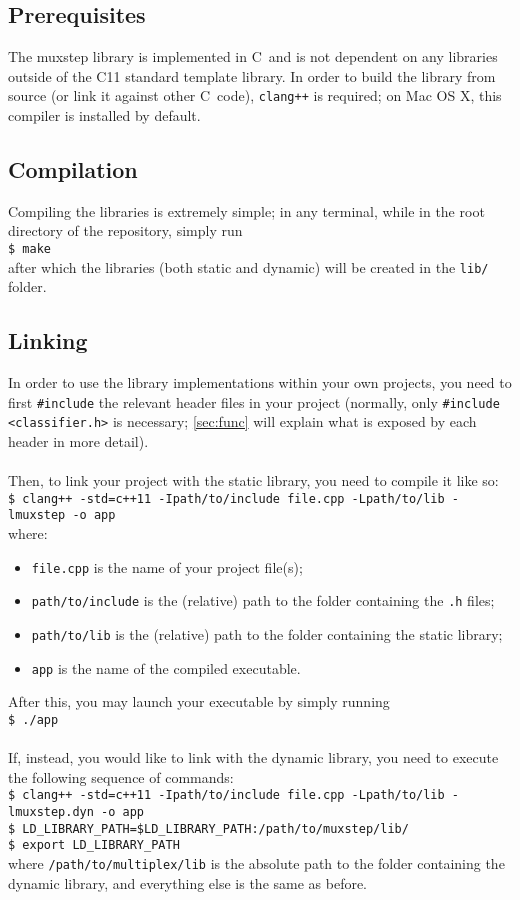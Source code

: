 \documentclass[12pt]{article}
\def\CC{{C\nolinebreak[4]\hspace{-.05em}\raisebox{.4ex}{\tiny\bf ++}}}
\newcommand{\shellcmd}[1]{\\\indent\indent\texttt{\footnotesize\$ #1}}
\begin{document}
	\subsection{Prerequisites}
	The muxstep library is implemented in \CC\ and is not dependent on any libraries outside of the \CC11 standard template library. In order to build the library from source (or link it against other \CC\ code), {\tt clang++} is required; on Mac OS X, this compiler is installed by default.
	\subsection{Compilation}
	Compiling the libraries is extremely simple; in any terminal, while in the root directory of the repository, simply run
	\shellcmd{make}\\
	after which the libraries (both static and dynamic) will be created in the {\tt lib/} folder.
	\subsection{Linking}
	In order to use the library implementations within your own projects, you need to first {\tt \#include} the relevant header files in your project (normally, only {\tt \#include <classifier.h>} is necessary; \cref{sec:func} will explain what is exposed by each header in more detail).\\ \\
	Then, to link your project with the static library, you need to compile it like so:
	\shellcmd{clang++ -std=c++11 -Ipath/to/include file.cpp -Lpath/to/lib -lmuxstep -o app}\\
	where:
	\begin{itemize}
		\item {\tt file.cpp} is the name of your project file(s);
		\item {\tt path/to/include} is the (relative) path to the folder containing the {\tt .h} files;
		\item {\tt path/to/lib} is the (relative) path to the folder containing the static library;
		\item {\tt app} is the name of the compiled executable.
	\end{itemize}
	After this, you may launch your executable by simply running
	\shellcmd{./app}\\ \\
	If, instead, you would like to link with the dynamic library, you need to execute the following sequence of commands:
	\shellcmd{clang++ -std=c++11 -Ipath/to/include file.cpp -Lpath/to/lib -lmuxstep.dyn -o app}
	\shellcmd{LD\_LIBRARY\_PATH=\$LD\_LIBRARY\_PATH:/path/to/muxstep/lib/}
	\shellcmd{export LD\_LIBRARY\_PATH}\\
	where {\tt /path/to/multiplex/lib} is the absolute path to the folder containing the dynamic library, and everything else is the same as before.
\end{document}

